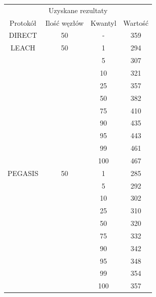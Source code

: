 \documentclass[a4paper,12pt,twoside,openany]{report}
\begin{document}
\begin{longtable}{*{4}{c}}
\toprule
\multicolumn{4}{c}{Uzyskane rezultaty} \\
Protokół	& Ilość węzłów	& Kwantyl	& Wartość \\
\midrule
\endhead
DIRECT	& 50 	& -	& 359 \\*
\midrule
LEACH	& 50	& 1	& 294 \\*
	&	& 5	& 307 \\*
	&	& 10	& 321 \\*
	&	& 25	& 357 \\*
	&	& 50	& 382 \\*
	&	& 75	& 410 \\*
	&	& 90	& 435 \\*
	&	& 95	& 443 \\*
	&	& 99	& 461 \\*
	&	& 100	& 467 \\*
\midrule
PEGASIS	& 50	& 1	& 285 \\*
	&	& 5	& 292 \\*
	&	& 10	& 302 \\*
	&	& 25	& 310 \\*
	&	& 50	& 320 \\*
	&	& 75	& 332 \\*
	&	& 90	& 342 \\*
	&	& 95	& 348 \\*
	&	& 99	& 354 \\*
	&	& 100	& 357 \\*
\bottomrule
\end{longtable}
\end{document}
